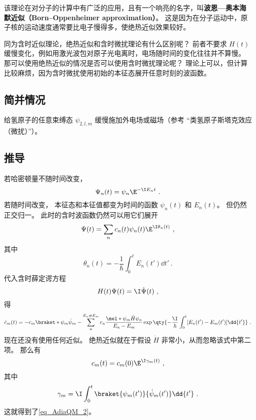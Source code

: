 该理论在对分子的计算中有广泛的应用，且有一个响亮的名字，叫\textbf{波恩—奥本海默近似（Born–Oppenheimer approximation）}。 这是因为在分子运动中，原子核的运动速度通常要比电子慢得多，使绝热近似效果较好。

同为含时近似理论，绝热近似和含时微扰理论有什么区别呢？ 前者不要求 $H(t)$ 缓慢变化，例如用激光波包对原子光电离时，电场随时间的变化往往并不算慢。 那可以使用绝热近似的情况是否可以使用含时微扰理论呢？ 理论上可以，但计算比较麻烦，因为含时微扰使用初始的本征态展开任意时刻的波函数。

\subsection{简并情况}

\begin{example}{}
给氢原子的任意束缚态 $\psi_{2,l,m}$ 缓慢施加外电场或磁场（参考 “类氢原子斯塔克效应（微扰）”）。
\end{example}

\subsection{推导}
若哈密顿量不随时间改变，
\begin{equation}
\Psi_n(t) = \psi_n \E^{-\I E_n t}~.
\end{equation}
若随时间改变， 本征态和本征值都变为时间的函数 $\psi_n(t)$ 和 $E_n(t)$。 但仍然正交归一。 此时的含时波函数仍然可以用它们展开
\begin{equation}
\Psi(t) = \sum_n c_n(t) \psi_n(t) \E^{\I \theta_n(t)}~,
\end{equation}
其中
\begin{equation}
\theta_n(t) = -\frac{1}{\hbar} \int_0^t E_n(t')\dd{t'}~.
\end{equation}
代入含时薛定谔方程
\begin{equation}\label{eq_AdiaQM_1}
H(t)\Psi(t) = \I \dot \Psi(t)~,
\end{equation}
得
\begin{equation}
\dot c_m(t) = -c_m \braket*{\psi_m}{\dot\psi_m} - \sum_{n}^{E_n\ne E_m} c_n \frac{\mel*{\psi_m}{\dot H}{\psi_n}}{E_n-E_m} \exp\qty{{-\frac{\I}{\hbar}\int_0^t[E_n(t')-E_m(t')]\dd{t'}}}~.
\end{equation}
现在还没有使用任何近似。 绝热近似就在于假设 $\dot H$ 非常小，从而忽略该式中第二项。 那么有
\begin{equation}
c_m(t) = c_m(0)\E^{\I\gamma_m(t)}~,
\end{equation}
其中
\begin{equation}
\gamma_m = \I \int_0^t \braket{\psi_m(t')}{\dot\psi_m(t')}\dd{t'}~.
\end{equation}
这就得到了\autoref{eq_AdiaQM_2}。
